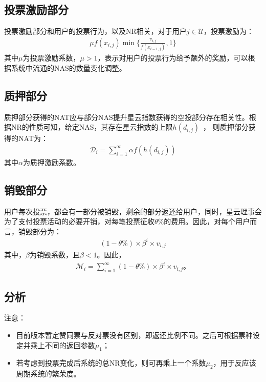 \subsection{投票激励部分}
投票激励部分和用户的投票行为，以及NR相关，对于用户$j \in \mathcal{U}$，投票激励为：
\begin{align}
\mu f(x_{i,j}) \min\{\frac{v_{i,j}}{f(x_{i-1,j})},1\}
\end{align}
\noindent 其中$\mu$为投票激励系数，$\mu > 1$，表示对用户的投票行为给予额外的奖励，可以根据系统中流通的NAS的数量变化调整。

\subsection{质押部分}
质押部分获得的NAT应与部分NAS提升星云指数获得的空投部分存在相关性。根据NR的性质可知，给定NAS，其存在星云指数的上限$h(d_{i,j})$~\cite{ImproveNR}，
则质押部分获得的NAT为：
\begin{align}
\mathcal{D}_i = \sum_{i=1}^{\infty}\alpha f(h(d_{i,j}))
\end{align}
\noindent 其中$\alpha$为质押激励系数。


\subsection{销毁部分}
\label{burn}
用户每次投票，都会有一部分被销毁，剩余的部分返还给用户，同时，星云理事会为了支付投票活动的必要开销，对每笔投票征收$\theta\%$的费用。因此，对每个用户而言，销毁部分为：
\begin{align}
(1-\theta\%) \times \beta^i \times v_{i,j}
\end{align}
\noindent 其中，$\beta$为销毁系数，且$\beta < 1$。因此，
\begin{align}
    \mathcal{M}_i = \sum_{i=1}^{\infty} (1-\theta\%) \times \beta^i \times v_{i,j} 。
\end{align}

\subsection{分析}

注意：
\begin{itemize}
\item 目前版本暂定赞同票与反对票没有区别，即返还比例不同。之后可根据票种设定并乘上不同的返回参数$\mu_1$；
\item 若考虑到投票完成后系统的总NR变化，则可再乘上一个系数$\mu_2$，用于反应该周期系统的繁荣度。
\end{itemize}


